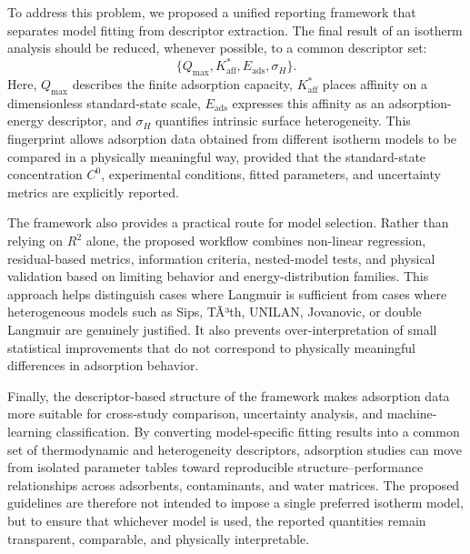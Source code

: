 \documentclass[journal=jacsat,manuscript=article]{achemso}
\begin{document}
	To address this problem, we proposed a unified reporting framework that separates model fitting from descriptor extraction. The final result of an isotherm analysis should be reduced, whenever possible, to a common descriptor set:
	\[
	\{Q_{\max}, K_{\mathrm{aff}}^{\ast}, E_{\mathrm{ads}}, \sigma_H\}.
	\]
	Here, \(Q_{\max}\) describes the finite adsorption capacity, \(K_{\mathrm{aff}}^{\ast}\) places affinity on a dimensionless standard-state scale, \(E_{\mathrm{ads}}\) expresses this affinity as an adsorption-energy descriptor, and \(\sigma_H\) quantifies intrinsic surface heterogeneity. This fingerprint allows adsorption data obtained from different isotherm models to be compared in a physically meaningful way, provided that the standard-state concentration \(C^0\), experimental conditions, fitted parameters, and uncertainty metrics are explicitly reported.
	
	The framework also provides a practical route for model selection. Rather than relying on \(R^2\) alone, the proposed workflow combines non-linear regression, residual-based metrics, information criteria, nested-model tests, and physical validation based on limiting behavior and energy-distribution families. This approach helps distinguish cases where Langmuir is sufficient from cases where heterogeneous models such as Sips, TÃ³th, UNILAN, Jovanovic, or double Langmuir are genuinely justified. It also prevents over-interpretation of small statistical improvements that do not correspond to physically meaningful differences in adsorption behavior.
	
	Finally, the descriptor-based structure of the framework makes adsorption data more suitable for cross-study comparison, uncertainty analysis, and machine-learning classification. By converting model-specific fitting results into a common set of thermodynamic and heterogeneity descriptors, adsorption studies can move from isolated parameter tables toward reproducible structure--performance relationships across adsorbents, contaminants, and water matrices. The proposed guidelines are therefore not intended to impose a single preferred isotherm model, but to ensure that whichever model is used, the reported quantities remain transparent, comparable, and physically interpretable.

\end{document}
